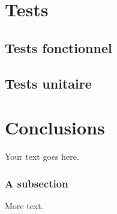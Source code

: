 \documentclass[11pt]{report} %
\begin{document}
\chapter{Tests}
	\section{Tests fonctionnel}
	\section{Tests unitaire}
\chapter{Conclusions}



Your text goes here.

\subsection{A subsection}

More text.
\end{document}
